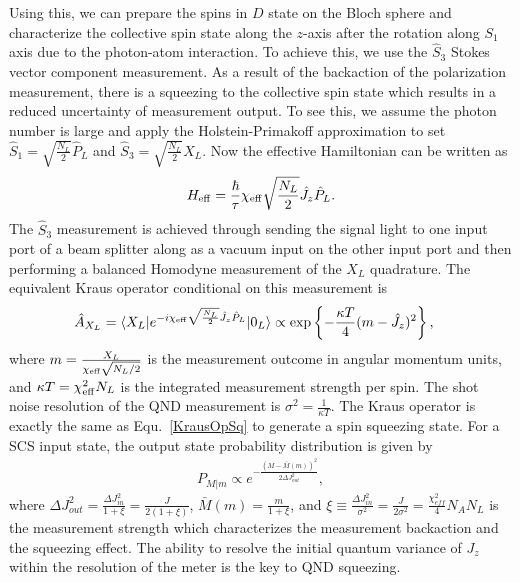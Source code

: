 \documentclass[preprint,aps,pra,onecolumn]{revtex4-1} %
\begin{document}
Using this, we can prepare the spins in $ D $ state on the Bloch sphere and characterize the collective spin state along the $ z $-axis after the rotation along $ S_1 $ axis due to the photon-atom interaction. To achieve this, we use the $ \hat{S}_3 $ Stokes vector component measurement. As a result of the backaction of the polarization measurement, there is a squeezing to the collective spin state which results in a reduced uncertainty of measurement output. To see this, we assume the photon number is large and apply the Holstein-Primakoff approximation to set $ \hat{S}_1=\sqrt{\frac{N_L}{2}}\hat{P}_L $ and $ \hat{S}_3=\sqrt{\frac{N_L}{2}}\hat{X}_L $. Now the effective Hamiltonian can be written as
\begin{align}
H_{\rm eff} = \frac{\hbar}{\tau} \chi_{\rm eff} \sqrt{\frac{N_L}{2}}\hat{J}_z \hat{P}_L. 
\end{align}
The $ \hat{S}_3 $ measurement is achieved through sending the signal light to one input port of a beam splitter along as a vacuum input on the other input port and then performing a balanced Homodyne measurement of the $ X_L $ quadrature. The equivalent Kraus operator conditional on this measurement is 
\begin{align}
\hat{A}_{X_L} &= \langle{X_L}\rvert e^{-i\chi_{\rm eff} \sqrt{\frac{N_L}{2}}\hat{J}_z \hat{P}_L} \lvert{0_L}\rangle\propto \exp\left\{ -\frac{\kappa T}{4}(m-\hat{J}_z)^2 \right\},
\end{align} 
where $ m=\frac{X_L}{\chi_{\rm eff} \sqrt{N_L/2}} $ is the measurement outcome in angular momentum units, and $ \kappa T=\chi_{\rm eff}^2N_L $ is the integrated measurement strength per spin. The shot noise resolution of the QND measurement is $ \sigma^2=\frac{1}{\kappa T} $. The Kraus operator is exactly the same as Equ.~\eqref{KrausOpSq} to generate a spin squeezing
 state. For a SCS input state, the output state probability distribution is given by 
\begin{align}
P_{M|m} \propto e^{-\frac{(M-\bar{M}(m))^2}{2\Delta J_{out}^2}},
\end{align}
where $ \Delta J_{out}^2 =\frac{\Delta J_{in}^2}{1+\xi}=\frac{J}{2(1+\xi)} $, $ \bar{M}(m)=\frac{m}{1+\xi} $, and $ \xi\equiv \frac{\Delta J_{in}^2}{\sigma^2}=\frac{J}{2\sigma^2}=\frac{\chi_{e\!f\!f}^2}{4}N_AN_L $ is the measurement strength which characterizes the measurement backaction and the squeezing effect. The ability to resolve the initial quantum variance of $ J_z $ within the resolution of the meter is the key to QND squeezing.
\end{document}
